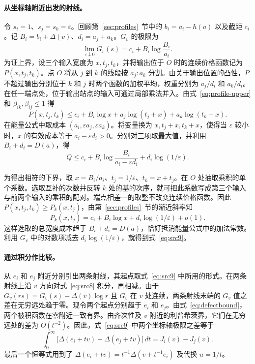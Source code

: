 \paragraph{从坐标轴附近出发的射线。}
令 $s_i=1$、$s_j=s_k=\varepsilon$。回顾第~\ref{sec:profiles}~节中的 $b_i=a_i-h(a)$ 以及截距 $c_i$。记 $B_i=b_i+\Delta(v)$、$d_i=a_j+a_k$。$G_v$ 的极限为
\begin{equation}\label{eq:src9}
           \lim_{\varepsilon\downarrow0}G_v(s)
                =c_i+B_i\log\frac{B_i}{a_i}.
\end{equation}
为证上界，设三个输入宽度为 $x,t_j,t_k$，并将输出位于 $O$ 时的连续价格函数记为 $P(x,t_j,t_k)$。点 $O$ 将从 $j$ 到 $k$ 的线段按 $a_j:a_k$ 分割。由关于输出位置的凸性，$P$ 不超过输出分别位于 $k$ 和 $j$ 时两个函数的加权平均，权重分别为 $a_j/d_i$ 和 $a_k/d_i$。在任一端点处，位于输出站点的输入可通过局部乘法并入。由式~\eqref{eq:profile-upper} 和 $\beta_{ik},\beta_{ij}\le1$ 得
\[
 P(x,t_j,t_k)\le c_i+B_i\log x
                +a_j\log(t_j+x)+a_k\log(t_k+x).
\]
在能量公式中取成本 $(a_i,\varepsilon a_j,\varepsilon a_k)$。将变量换为 $x,t_j+x,t_k+x$，使得当 $\varepsilon$ 较小时，$x$ 的有效成本等于 $a_i-\varepsilon d_i>0$。分别对三项取最大值，并利用 $B_i+d_i=D(a)$，得
\[
 Q\le c_i+B_i\log\frac{B_i}{a_i-\varepsilon d_i}
                  +d_i\log(1/\varepsilon).
\]

为得出相符的下界，取 $x=B_i/a_i$、$t_j=1/\varepsilon$、$t_k=x+t_j$。在 $O$ 处抽取乘积的单个系数。选取互补的次数并反转 $k$ 处的基的次序，就可把此系数写成第三个输入与前两个输入的乘积的配对。端点相差一的取整不改变连续价格函数。因此 $P(x,t_j,t_k)\ge P_k(x,t_j)$，由第~\ref{sec:profiles}~节的渐近斜率知
\[
       P_k(x,t_j)=c_i+B_i\log x+d_i\log(1/\varepsilon)+o(1).
\]
这样选取的总宽度成本趋于 $B_i+d_i=D(a)$，恰好抵消能量公式中的加法常数。利用 $G_v$ 中的对数项减去 $d_i\log(1/\varepsilon)$，就得到式~\eqref{eq:src9}。

\paragraph{通过积分作比较。}
从 $e_i$ 和 $e_j$ 附近分别引出两条射线，其起点取式~\eqref{eq:src9} 中所用的形式。在两条射线上沿 $v$ 方向对式~\eqref{eq:src8} 积分，再相减。由于 $G_v(rs)=G_v(s)-\Delta(v)\log r$ 且 $G_v$ 在 $v$ 处连续，两条射线末端的 $G_v$ 值之差在无穷远处趋于零。现令两个起点分别趋于 $e_i$ 和 $e_j$。由式~\eqref{eq:defectbound}，两个被积函数在零附近一致有界。由齐次性及 $v$ 附近的利普希茨界，它们在无穷远处的差为 $O(t^{-2})$。因此，式~\eqref{eq:src9} 中两个坐标轴极限之差等于
\[
 \int_0^\infty\big[\Delta(e_i+tv)-\Delta(e_j+tv)\big]\,dt
    =J_i(v)-J_j(v).
\]
最后一个恒等式用到了 $\Delta(e_i+tv)=t^{-1}\Delta(v+t^{-1}e_i)$ 及代换 $u=1/t$。

